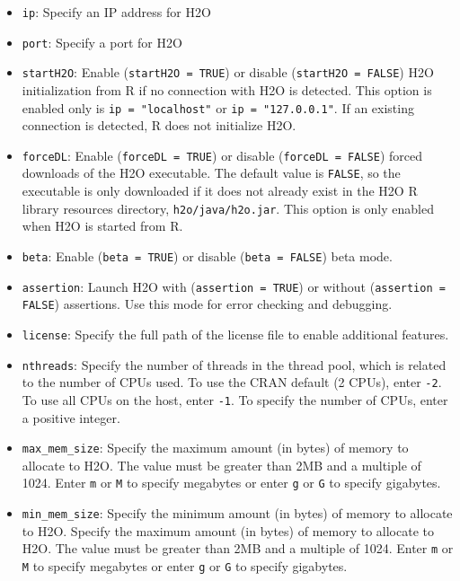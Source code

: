 \documentclass[11pt]{article}
\begin{document}
\begin{itemize}
\item {\texttt{ip}}: Specify an IP address for H2O
\item {\texttt{port}}: Specify a port for H2O
\item {\texttt{startH2O}}: Enable ({\texttt{startH2O = TRUE}}) or disable ({\texttt{startH2O = FALSE}}) H2O initialization from R if no connection with H2O is detected. This option is enabled only is {\texttt{ip = "localhost"}} or {\texttt{ip = "127.0.0.1"}}. If an existing connection is detected, R does not initialize H2O. 
\item {\texttt{forceDL}}: Enable ({\texttt{forceDL = TRUE}}) or disable ({\texttt{forceDL = FALSE}}) forced downloads of the H2O executable. The default value is {\texttt{FALSE}}, so the executable is  only downloaded if it does not already exist in the H2O R library resources directory, {\texttt{h2o/java/h2o.jar}}. This option is only enabled when H2O is started from R. 
\item {\texttt{beta}}:  Enable ({\texttt{beta = TRUE}}) or disable ({\texttt{beta = FALSE}}) beta mode. 
\item {\texttt{assertion}}: Launch H2O with ({\texttt{assertion = TRUE}}) or without ({\texttt{assertion = FALSE}}) assertions. Use this mode for error checking and debugging. 
\item {\texttt{license}}: Specify the full path of the license file to enable additional features. 
\item {\texttt{nthreads}}: Specify the number of threads in the thread pool, which is related to the number of CPUs used. To use the CRAN default (2 CPUs), enter {\texttt{-2}}. To use all CPUs on the host, enter {\texttt{-1}}. To specify the number of CPUs, enter a positive integer. 
\item {\texttt{max_mem_size}}: Specify the maximum amount (in bytes) of memory to allocate to H2O. The value must be greater than 2MB and a multiple of 1024. Enter {\texttt{m}} or {\texttt{M}} to specify megabytes or enter {\texttt{g}} or {\texttt{G}} to specify gigabytes. 
\item {\texttt{min_mem_size}}: Specify the minimum amount (in bytes) of memory to allocate to H2O. Specify the maximum amount (in bytes) of memory to allocate to H2O. The value must be greater than 2MB and a multiple of 1024. Enter {\texttt{m}} or {\texttt{M}} to specify megabytes or enter {\texttt{g}} or {\texttt{G}} to specify gigabytes.
\end{itemize}
\end{document}
